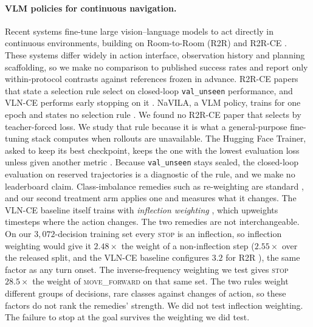 \paragraph{VLM policies for continuous navigation.}
Recent systems fine-tune large vision--language models to act directly in continuous environments,
building on Room-to-Room (R2R) and R2R-CE \citep{anderson2018r2r,krantz2020beyond,hong2022bridging}.
These systems differ widely in action interface, observation history and planning scaffolding, so we
make no comparison to published success rates and report only within-protocol contrasts against
references frozen in advance. R2R-CE papers that state a selection rule select on closed-loop
\texttt{val\_unseen} performance, and VLN-CE performs early stopping on it
\citep{krantz2020beyond}. NaVILA, a VLM policy, trains for one epoch and states no selection rule
\citep{cheng2025navila}. We found no R2R-CE paper that selects by teacher-forced loss. We study that
rule because it is what a general-purpose fine-tuning stack computes when rollouts are unavailable.
The Hugging Face Trainer, asked to keep its best checkpoint, keeps the one with the lowest
evaluation loss unless given another metric \citep{hf2026trainer}. Because \texttt{val\_unseen}
stays sealed, the closed-loop evaluation on reserved trajectories is a diagnostic of the rule, and
we make no leaderboard claim. Class-imbalance remedies such as re-weighting are standard
\citep{cui2019classbalanced}, and our second treatment arm applies one and measures what it changes.
The VLN-CE baseline itself trains with \emph{inflection weighting} \citep{wijmans2019eqa}, which
upweights timesteps where the action changes. The two remedies are not interchangeable. On our
$3{,}072$-decision training set every \textsc{stop} is an inflection, so inflection weighting would
give it $2.48\times$ the weight of a non-inflection step ($2.55\times$ over the released split, and
the VLN-CE baseline configures $3.2$ for R2R \citep{krantz2020beyond}), the same factor as any turn
onset. The inverse-frequency weighting we test gives \textsc{stop} $28.5\times$ the weight of
\textsc{move\_forward} on that same set. The two rules weight different groups of decisions, rare
classes against changes of action, so these factors do not rank the remedies' strength. We did not
test inflection weighting. The failure to stop at the goal survives the weighting we did test.
